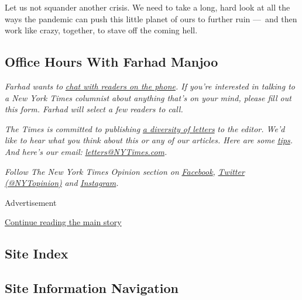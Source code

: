 Let us not squander another crisis. We need to take a long, hard look at
all the ways the pandemic can push this little planet of ours to further
ruin ---~and then work like crazy, together, to stave off the coming
hell.

\hypertarget{office-hours-with-farhad-manjoo}{%
\subsection{Office Hours With Farhad
Manjoo}\label{office-hours-with-farhad-manjoo}}

\emph{Farhad wants to}
\href{https://www.nytimes3xbfgragh.onion/2019/05/16/opinion/farhad-office-hours.html?module=inline}{\emph{chat
with readers on the phone}}\emph{. If you're interested in talking to a
New York Times columnist about anything that's on your mind, please fill
out this form. Farhad will select a few readers to call.}

\emph{The Times is committed to publishing}
\href{https://www.nytimes3xbfgragh.onion/2019/01/31/opinion/letters/letters-to-editor-new-york-times-women.html}{\emph{a
diversity of letters}} \emph{to the editor. We'd like to hear what you
think about this or any of our articles. Here are some}
\href{https://help.nytimes3xbfgragh.onion/hc/en-us/articles/115014925288-How-to-submit-a-letter-to-the-editor}{\emph{tips}}\emph{.
And here's our email:}
\href{mailto:letters@NYTimes.com}{\emph{letters@NYTimes.com}}\emph{.}

\emph{Follow The New York Times Opinion section on}
\href{https://www.facebookcorewwwi.onion/nytopinion}{\emph{Facebook}}\emph{,}
\href{http://twitter.com/NYTOpinion}{\emph{Twitter (@NYTopinion)}}
\emph{and}
\href{https://www.instagram.com/nytopinion/}{\emph{Instagram}}\emph{.}

Advertisement

\protect\hyperlink{after-bottom}{Continue reading the main story}

\hypertarget{site-index}{%
\subsection{Site Index}\label{site-index}}

\hypertarget{site-information-navigation}{%
\subsection{Site Information
Navigation}\label{site-information-navigation}}

